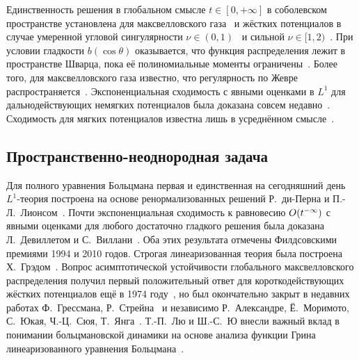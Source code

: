 Единственность решения в глобальном смысле \(t\in[0,+\infty]\) в соболевском пространстве установлена
для максвелловского газа~\cite{Toscani1999maxw} и жёстких потенциалов в случае
умеренной угловой сингулярности \(\nu\in(0,1)\)~\cite{Mouhot2009} и сильной \(\nu\in[1,2)\)~\cite{He2012}.
При условии гладкости \(b(\cos\theta)\) оказывается, что функция распределения лежит в пространстве Шварца,
пока её полиномиальные моменты ограничены~\cite{Desvillettes2005, Alexandre2012}.
Более того, для максвелловского газа известно, что регулярность по Жевре распространяется~\cite{Desvillettes2009}.
Экспоненциальная сходимость с явными оценками в \(L^1\) для дальнодействующих немягких потенциалов
была доказана совсем недавно~\cite{Tristani2014, Meng2017}.
Сходимость для мягких потенциалов известна лишь в усреднённом смысле~\cite{Carlen2009}.

\subsection{Пространственно-неоднородная задача}

Для полного уравнения Больцмана первая и единственная на сегодняшний день \(L^1\)-теория
построена на основе ренормализованных решений Р.~ди-Перна и П.-Л.~Лионсом~\autocite{Lions1989}.
Почти экспоненциальная сходимость к равновесию \(O(t^{-\infty})\) с явными оценками
для любого достаточно гладкого решения была доказана Л.~Девиллетом и С.~Виллани~\autocite{Villani2005}.
Оба этих результата отмечены Филдсовскими премиями 1994 и 2010 годов.
Строгая линеаризованная теория была построена Х.~Грэдом~\autocite{Grad1963b}.
Вопрос асимптотической устойчивости глобального максвелловского распределения
получил первый положительный ответ для короткодействующих жёстких потенциалов ещё в 1974 году~\autocite{Ukai1974},
но был окончательно закрыт в недавних работах Ф.~Грессмана, Р.~Стрейна~\autocite{Strain2011} и независимо
Р.~Александре, Ё.~Моримото, С.~Юкая, Ч.-Ц.~Сюя, Т.~Янга~\autocite{Alexandre2012soft}.
Т.-П.~Лю и Ш.-С.~Ю внесли важный вклад в понимании больцмановской динамики
на основе анализа функции Грина линеаризованного уравнения Больцмана~\autocite{Liu2004green, Liu2006}.

